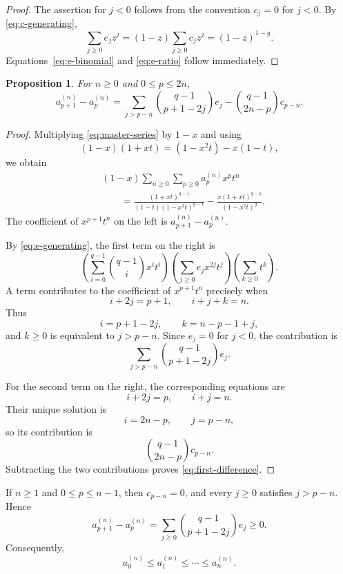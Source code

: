 \documentclass[12pt]{amsart}
\theoremstyle{plain}
\newtheorem{proposition}[theorem]{Proposition}
\theoremstyle{definition}
\theoremstyle{remark}
\begin{document}
\begin{proof}
The assertion for \(j<0\) follows from the convention \(c_j=0\) for
\(j<0\).  By \eqref{eq:c-generating},
\[
 \sum_{j\ge0}e_jz^j
 =(1-z)\sum_{j\ge0}c_jz^j
 =(1-z)^{1-g}.
\]
Equations~\eqref{eq:e-binomial} and \eqref{eq:e-ratio} follow
immediately.
\end{proof}

\begin{proposition}\label{prop:first-difference}
For \(n\ge0\) and \(0\le p\le2n\),
\begin{equation}\label{eq:first-difference}
 a_{p+1}^{(n)}-a_p^{(n)}
 =
 \sum_{j>p-n}
 \binom{q-1}{p+1-2j}e_j
 -
 \binom{q-1}{2n-p}c_{p-n}.
\end{equation}
\end{proposition}

\begin{proof}
Multiplying \eqref{eq:master-series} by \(1-x\) and using
\[
 (1-x)(1+xt)=(1-x^2t)-x(1-t),
\]
we obtain
\begin{align*}
 &(1-x)\sum_{n\ge0}\sum_{p\ge0}a_p^{(n)}x^pt^n\\
 &\qquad=
 \frac{(1+xt)^{q-1}}{(1-t)(1-x^2t)^{g-1}}
 -
 \frac{x(1+xt)^{q-1}}{(1-x^2t)^g}.
\end{align*}
The coefficient of \(x^{p+1}t^n\) on the left is
\(a_{p+1}^{(n)}-a_p^{(n)}\).

By \eqref{eq:e-generating}, the first term on the right is
\[
 \left(\sum_{i=0}^{q-1}\binom{q-1}{i}x^it^i\right)
 \left(\sum_{j\ge0}e_jx^{2j}t^j\right)
 \left(\sum_{k\ge0}t^k\right).
\]
A term contributes to the coefficient of \(x^{p+1}t^n\) precisely when
\[
 i+2j=p+1,
 \qquad
 i+j+k=n.
\]
Thus
\[
 i=p+1-2j,
 \qquad
 k=n-p-1+j,
\]
and \(k\ge0\) is equivalent to \(j>p-n\).  Since \(e_j=0\) for
\(j<0\), the contribution is
\[
 \sum_{j>p-n}\binom{q-1}{p+1-2j}e_j.
\]

For the second term on the right, the corresponding equations are
\[
 i+2j=p,
 \qquad
 i+j=n.
\]
Their unique solution is
\[
 i=2n-p,
 \qquad
 j=p-n,
\]
so its contribution is
\[
 \binom{q-1}{2n-p}c_{p-n}.
\]
Subtracting the two contributions proves \eqref{eq:first-difference}.
\end{proof}

If \(n\ge1\) and \(0\le p\le n-1\), then \(c_{p-n}=0\), and every
\(j\ge0\) satisfies \(j>p-n\).  Hence
\begin{equation}\label{eq:left-half-increasing}
 a_{p+1}^{(n)}-a_p^{(n)}
 =
 \sum_{j\ge0}\binom{q-1}{p+1-2j}e_j
 \ge0.
\end{equation}
Consequently,
\[
 a_0^{(n)}\le a_1^{(n)}\le\cdots\le a_n^{(n)}.
\]
\end{document}
